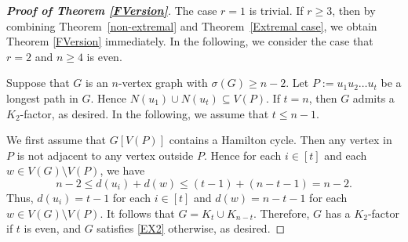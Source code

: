 \documentclass[11pt, a4paper]{article}
\theoremstyle{definition}
\newcommand{\<}{\subseteq}
\begin{document}
\begin{proof}[\bf Proof of Theorem \ref{FVersion}]
The case $r=1$ is trivial. If $r\geq 3$, then by combining Theorem~\ref{non-extremal} and Theorem~\ref{Extremal case},  we obtain Theorem \ref{FVersion} immediately. In the following, we consider the case that $r=2$ and $n\geq 4$ is even. 


Suppose that $G$ is an $n$-vertex graph with $\sigma(G)\ge n-2$. %
Let  $P:=u_1u_2\ldots u_t$ be a longest path in $G$. Hence $N(u_1)\cup N(u_t)\subseteq V(P)$. If $t=n$, then $G$ admits a $K_2$-factor, as desired. In the following, we assume that $t\le n-1$. 

We first assume that $G[V(P)]$ contains a Hamilton cycle. %
Then any vertex in $P$ is not adjacent to any vertex outside $P$. Hence for each $i\in [t]$ and each $w\in V(G)\setminus V(P)$, we have 
$$
n-2\leq d(u_i)+d(w)\leq (t-1)+(n-t-1)=n-2.
$$
Thus, $d(u_i)=t-1$ for each $i\in [t]$ and $d(w)=n-t-1$ for each $w\in V(G)\setminus V(P)$. It follows that $G=K_t\cup K_{n-t}$. Therefore, $G$ has a $K_2$-factor if $t$ is even, and $G$ satisfies \ref{EX2} otherwise, as desired. 


\end{proof}
\end{document}
